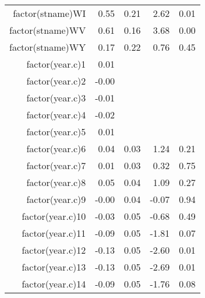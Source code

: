 \begin{table}[ht]
\begin{tabular}{rrrrr}
  factor(stname)WI & 0.55 & 0.21 & 2.62 & 0.01 \\ 
  factor(stname)WV & 0.61 & 0.16 & 3.68 & 0.00 \\ 
  factor(stname)WY & 0.17 & 0.22 & 0.76 & 0.45 \\ 
  factor(year.c)1 & 0.01 &  &  &  \\ 
  factor(year.c)2 & -0.00 &  &  &  \\ 
  factor(year.c)3 & -0.01 &  &  &  \\ 
  factor(year.c)4 & -0.02 &  &  &  \\ 
  factor(year.c)5 & 0.01 &  &  &  \\ 
  factor(year.c)6 & 0.04 & 0.03 & 1.24 & 0.21 \\ 
  factor(year.c)7 & 0.01 & 0.03 & 0.32 & 0.75 \\ 
  factor(year.c)8 & 0.05 & 0.04 & 1.09 & 0.27 \\ 
  factor(year.c)9 & -0.00 & 0.04 & -0.07 & 0.94 \\ 
  factor(year.c)10 & -0.03 & 0.05 & -0.68 & 0.49 \\ 
  factor(year.c)11 & -0.09 & 0.05 & -1.81 & 0.07 \\ 
  factor(year.c)12 & -0.13 & 0.05 & -2.60 & 0.01 \\ 
  factor(year.c)13 & -0.13 & 0.05 & -2.69 & 0.01 \\ 
  factor(year.c)14 & -0.09 & 0.05 & -1.76 & 0.08 \\ 
   \hline
\end{tabular}
\end{table}
